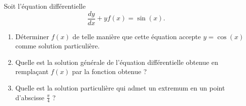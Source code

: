 \begin{exercice}\label{exoEquaDiff0004}

Soit l'équation différentielle
\begin{equation}
	\frac{ dy }{ dx }+yf(x)=\sin(x).
\end{equation}
\begin{enumerate}

\item
Déterminer $f(x)$ de telle manière que cette équation accepte $y=\cos(x)$ comme solution particulière.
\item
Quelle est la solution générale de l'équation différentielle obtenue en remplaçant $f(x)$ par la fonction obtenue ?
\item
Quelle est la solution particulière qui admet un extremum en un point d'abscisse $\frac{ \pi }{ 4 }$ ?

\end{enumerate}

\end{exercice}
